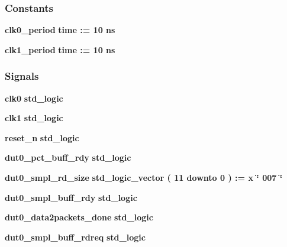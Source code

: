 \subsubsection*{Constants}
 \begin{DoxyCompactItemize}
\item 
{\bf clk0\+\_\+period} {\bfseries \textcolor{comment}{time}\textcolor{vhdlchar}{ }\textcolor{vhdlchar}{ }\textcolor{vhdlchar}{\+:}\textcolor{vhdlchar}{=}\textcolor{vhdlchar}{ }\textcolor{vhdlchar}{ }\textcolor{vhdlchar}{ } \textcolor{vhdldigit}{10} \textcolor{vhdlchar}{ }\textcolor{vhdlchar}{ns}\textcolor{vhdlchar}{ }} 
\item 
{\bf clk1\+\_\+period} {\bfseries \textcolor{comment}{time}\textcolor{vhdlchar}{ }\textcolor{vhdlchar}{ }\textcolor{vhdlchar}{\+:}\textcolor{vhdlchar}{=}\textcolor{vhdlchar}{ }\textcolor{vhdlchar}{ }\textcolor{vhdlchar}{ } \textcolor{vhdldigit}{10} \textcolor{vhdlchar}{ }\textcolor{vhdlchar}{ns}\textcolor{vhdlchar}{ }} 
\end{DoxyCompactItemize}
\subsubsection*{Signals}
 \begin{DoxyCompactItemize}
\item 
{\bf clk0} {\bfseries \textcolor{comment}{std\+\_\+logic}\textcolor{vhdlchar}{ }} 
\item 
{\bf clk1} {\bfseries \textcolor{comment}{std\+\_\+logic}\textcolor{vhdlchar}{ }} 
\item 
{\bf reset\+\_\+n} {\bfseries \textcolor{comment}{std\+\_\+logic}\textcolor{vhdlchar}{ }} 
\item 
{\bf dut0\+\_\+pct\+\_\+buff\+\_\+rdy} {\bfseries \textcolor{comment}{std\+\_\+logic}\textcolor{vhdlchar}{ }} 
\item 
{\bf dut0\+\_\+smpl\+\_\+rd\+\_\+size} {\bfseries \textcolor{comment}{std\+\_\+logic\+\_\+vector}\textcolor{vhdlchar}{ }\textcolor{vhdlchar}{(}\textcolor{vhdlchar}{ }\textcolor{vhdlchar}{ } \textcolor{vhdldigit}{11} \textcolor{vhdlchar}{ }\textcolor{keywordflow}{downto}\textcolor{vhdlchar}{ }\textcolor{vhdlchar}{ } \textcolor{vhdldigit}{0} \textcolor{vhdlchar}{ }\textcolor{vhdlchar}{)}\textcolor{vhdlchar}{ }\textcolor{vhdlchar}{ }\textcolor{vhdlchar}{ }\textcolor{vhdlchar}{\+:}\textcolor{vhdlchar}{=}\textcolor{vhdlchar}{ }\textcolor{vhdlchar}{ }\textcolor{vhdlchar}{x}\textcolor{vhdlchar}{ }\textcolor{keyword}{\char`\"{} 007 \char`\"{}}\textcolor{vhdlchar}{ }} 
\item 
{\bf dut0\+\_\+smpl\+\_\+buff\+\_\+rdy} {\bfseries \textcolor{comment}{std\+\_\+logic}\textcolor{vhdlchar}{ }} 
\item 
{\bf dut0\+\_\+data2packets\+\_\+done} {\bfseries \textcolor{comment}{std\+\_\+logic}\textcolor{vhdlchar}{ }} 
\item 
{\bf dut0\+\_\+smpl\+\_\+buff\+\_\+rdreq} {\bfseries \textcolor{comment}{std\+\_\+logic}\textcolor{vhdlchar}{ }} 
\end{DoxyCompactItemize}

